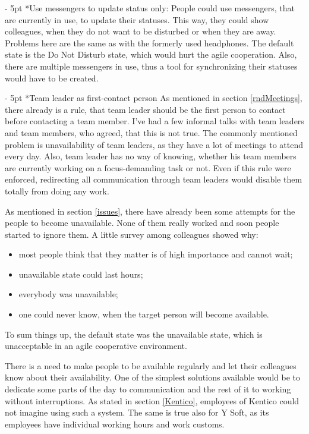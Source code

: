 \documentclass[11pt,singleside]{myfithesis2}
\makeatletter
\renewcommand\paragraph{
   \vspace{-10pt}
   \@startsection{paragraph}{4}{0mm}
      {\baselineskip}
      {- 5pt}
      {\normalfont\normalsize\bfseries}
}
\makeatother
\begin{document}
\paragraph*{Use messengers to update status only: } People could use messengers, that are currently in use, to update their statuses. This way, they could show colleagues, when they do not want to be disturbed or when they are away. Problems here are the same as with the formerly used headphones. The default state is the Do Not Disturb state, which would hurt the agile cooperation. Also, there are multiple messengers in use, thus a tool for synchronizing their statuses would have to be created.

\paragraph*{Team leader as first-contact person} As mentioned in section \ref{rndMeetings}, there already is a rule, that team leader should be the first person to contact before contacting a team member. I've had a few informal talks with team leaders and team members, who agreed, that this is not true. The commonly mentioned problem is unavailability of team leaders, as they have a lot of meetings to attend every day. Also, team leader has no way of knowing, whether his team members are currently working on a focus-demanding task or not. Even if this rule were enforced, redirecting all communication through team leaders would disable them totally from doing any work.

As mentioned in section \ref{issues}, there have already been some attempts for the people to become unavailable. None of them really worked and soon people started to ignore them. A little survey among colleagues showed why:
\begin{itemize}
	\item most people think that they matter is of high importance and cannot wait;
	\item unavailable state could last hours;
	\item everybody was unavailable;
	\item one could never know, when the target person will become available.
\end{itemize}
To sum things up, the default state was the unavailable state, which is unacceptable in an agile cooperative environment.

There is a need to make people to be available regularly and let their colleagues know about their availability. One of the simplest solutions available would be to dedicate some parts of the day to communication and the rest of it to working without interruptions. As stated in section \ref{Kentico}, employees of Kentico could not imagine using such a system. The same is true also for Y Soft, as its employees have individual working hours and work customs. 
\end{document}
